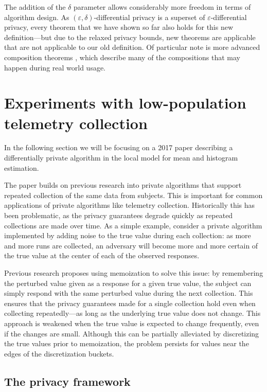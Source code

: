 \documentclass[12pt]{article}
\renewcommand{\epsilon}{\varepsilon}
\begin{document}
The addition of the $\delta$ parameter allows considerably more freedom in terms of algorithm design. As $(\epsilon,\delta)$-differential privacy is a superset of $\epsilon$-differential privacy, every theorem that we have shown so far also holds for this new definition---but due to the relaxed privacy bounds, new theorems are applicable that are not applicable to our old definition. Of particular note is more advanced composition theorems \cite[Sec.~3.5.2]{dwork_privacybook}, which describe many of the compositions that may happen during real world usage.

\newpage
\section{Experiments with low-population telemetry collection \label{sec:telemetry}}

In the following section we will be focusing on a 2017 paper \cite{microsoft_telemetry} describing a differentially private algorithm in the local model for mean and histogram estimation.

The paper builds on previous research \cite{google_rappor} into private algorithms that support repeated collection of the same data from subjects. This is important for common applications of private algorithms like telemetry collection. Historically this has been problematic, as the privacy guarantees degrade quickly as repeated collections are made over time. As a simple example, consider a private algorithm implemented by adding noise to the true value during each collection: as more and more runs are collected, an adversary will become more and more certain of the true value at the center of each of the observed responses.

Previous research \cite{google_rappor} proposes using memoization to solve this issue: by remembering the perturbed value given as a response for a given true value, the subject can simply respond with the same perturbed value during the next collection. This ensures that the privacy guarantees made for a single collection hold even when collecting repeatedly---as long as the underlying true value does not change. This approach is weakened when the true value is expected to change frequently, even if the changes are small. Although this can be partially alleviated by discretizing the true values prior to memoization, the problem persists for values near the edges of the discretization buckets.

\subsection{The privacy framework \label{sec:framework}}
\end{document}
